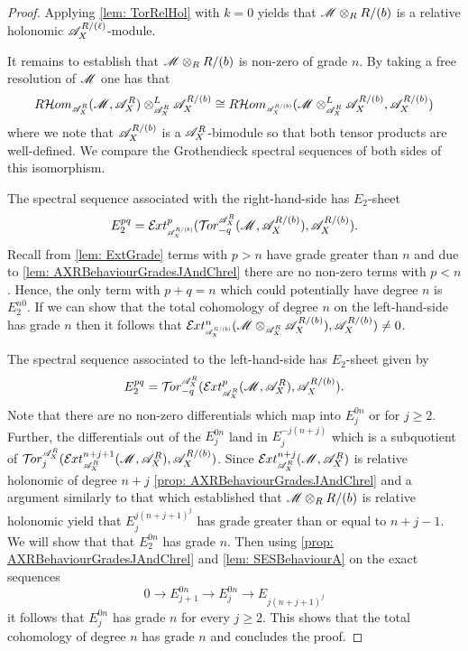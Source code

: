 \begin{proof}
  Applying \cref{lem: TorRelHol} with $k=0$ yields that $\mathscr{M} \otimes_R R/(b)$ is a relative holonomic $\mathscr{A}_X^{R/(\ell)}$-module.

  It remains to establish that $\mathscr{M} \otimes_R R/(b)$ is non-zero of grade $n$.
  By taking a free resolution of $\mathscr{M}$ one has that
  $$R\Hom_{\scaleto{\A_X^R}{8pt}}(\M,\A_X^R)\otimes_{\scaleto{\A_X^R}{8pt}}^L \A_X^{R/(b)} \cong R \Hom_{\scaleto{\A_X^{R/(b)}}{8pt}}(\M\otimes_{\scaleto{\A_X^R}{8pt}}^L \A_X^{R/(b)}, \A_X^{R/(b)}) $$
  where we note that $\mathscr{A}_X^{R/(b)}$ is a $\mathscr{A}_X^{R}$-bimodule so that both tensor products are well-defined.
  We compare the Grothendieck spectral sequences of both sides of this isomorphism.

  The spectral sequence associated with the right-hand-side has $E_2$-sheet
  $$E^{pq}_2 = \Ex{\A_X^{R/(b)}}{p}(\Tr{\A_X^R}{-q}(\M, \A_X^{R/(b)}), \A_X^{R/(b)}).$$
  Recall from \cref{lem: ExtGrade} terms with $p>n$ have grade greater than $n$ and due to \cref{lem: AXRBehaviourGradesJAndChrel} there are no non-zero terms with $p<n$.
  Hence, the only term with $p+q = n$ which could potentially have degree $n$ is $E^{n0}_2$.
  If we can show that the total cohomology of degree $n$ on the left-hand-side has grade $n$ then it follows that $\Ex{\A_X^{R/(b)}}{n}(\M\otimes_{\scaleto{\A_X^R}{8pt}} \A_X^{R/(b)}), \A_X^{R/(b)}) \neq 0$.

  The spectral sequence associated to the left-hand-side has $E_2$-sheet given by
  $$E_2^{pq} =\Tr{\A_X^R}{-q}( \Ex{\A_X^R}{p}(\M,\A_X^R), \A_X^{R/(b)}).$$
  Note that there are no non-zero differentials which map into $E_j^{0n}$ or for $j\geq 2$.
  Further, the differentials out of the $E^{0n}_j$ land in $E^{-j(n+j)}_j$ which is a subquotient of $\Tr{\A_X^R}{j}(\Ex{\A_X^R}{n+j+1}(\M,\ab \A_X^R)\ab , \A_X^{R/(b)})$.
  Since $\Ex{\A_X^R}{n+j}(\M,\A_X^R)$ is relative holonomic of degree $n+j$ \cref{prop: AXRBehaviourGradesJAndChrel} and a argument similarly to that which established that $\mathscr{M} \otimes_R R/(b)$ is relative holonomic yield that $E^{j(n+j+1)^j}_j$ has grade greater than or equal to $n+j-1$.
  We will show that that $E_2^{0n}$ has grade $n$.
  Then using \cref{prop: AXRBehaviourGradesJAndChrel} and \cref{lem: SESBehaviourA} on the exact sequences
  $$0 \to E_{j+1}^{0n}\to  E_j^{0n} \to E_{j(n+j+1)^j} $$
it follows that $E_j^{0n}$ has grade $n$ for every $j\geq 2$.
  This shows that the total cohomology of degree $n$ has grade $n$ and concludes the proof.


\end{proof}
